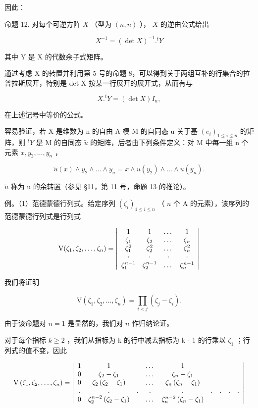 因此：

命题 12. 对每个可逆方阵 \(X\) （型为 \((n, n)\) ）， \(X\) 的逆由公式给出

\[
X ^ {- 1} = (\det X) ^ {- 1}. ^ {t} Y\tag{27}
\]

其中 Y 是 X 的代数余子式矩阵。

通过考虑 X 的转置并利用第 5 号的命题 8，可以得到关于两组互补的行集合的拉普拉斯展开，特别是 det X 按某一行展开的展开式，从而有与

\[
X. ^ {t} Y = (\det X) I _ {n},\tag{28}
\]

在上述记号中等价的公式。

容易验证，若 X 是维数为 n 的自由 A-模 M 的自同态 u 关于基 \((e_{i})_{1\leq i\leq n}\) 的矩阵，则 \(^{t}Y\) 是 M 的自同态 \(\tilde{u}\) 的矩阵，后者由下列条件定义：对 M 中每一组 n 个元素 \(x, y_{2}, \ldots, y_{n}\) ，

\[
\tilde {u} (x) \wedge y _ {2} \wedge \dots \wedge y _ {n} = x \wedge u (y _ {2}) \wedge \dots \wedge u (y _ {n}).
\]

\(\tilde{u}\) 称为 u 的余转置（参见 §11，第 11 号，命题 13 的推论）。

例。（1）范德蒙德行列式。给定序列 \((\zeta_{i})_{1\leqslant i\leqslant n}\) （ \(n\) 个 A 的元素），该序列的范德蒙德行列式是行列式

\[
\mathrm{V} (\zeta_ {1}, \zeta_ {2}, \dots , \zeta_ {n}) = \left| \begin{array}{c c c c} 1 & 1 & \dots & 1 \\ \zeta_ {1} & \zeta_ {2} & \dots & \zeta_ {n} \\ \zeta_ {1} ^ {2} & \zeta_ {2} ^ {2} & \dots & \zeta_ {n} ^ {2} \\ \cdot & \cdot & \cdot & \cdot \\ \zeta_ {1} ^ {n - 1} & \zeta_ {2} ^ {n - 1} & \dots & \zeta_ {n} ^ {n - 1} \end{array} \right|
\]

我们将证明

\[
\mathrm{V} \left(\zeta_ {1}, \zeta_ {2}, \dots , \zeta_ {n}\right) = \prod_ {i <   j} \left(\zeta_ {j} - \zeta_ {i}\right).\tag{29}
\]

由于该命题对 \(n = 1\) 是显然的，我们对 \(n\) 作归纳论证。

对于每个指标 \(k \geqslant 2\) ，我们从指标为 k 的行中减去指标为 k - 1 的行乘以 \(\zeta_{1}\) ；行列式的值不变，因此

\[
\mathrm{V} \left(\zeta_ {1}, \zeta_ {2}, \dots , \zeta_ {n}\right) = \left| \begin{array}{c c c c c c c c c} 1 & 1 & & \dots & 1 \\ 0 & \zeta_ {2} - \zeta_ {1} & & \dots & \zeta_ {n} - \zeta_ {1} \\ 0 & \zeta_ {2} \left(\zeta_ {2} - \zeta_ {1}\right) & & \dots & \zeta_ {n} \left(\zeta_ {n} - \zeta_ {1}\right) \\ . & . & . & . & . & . & . & . & . \\ 0 & \zeta_ {2} ^ {n - 2} \left(\zeta_ {2} - \zeta_ {1}\right) & & \dots & \zeta_ {n} ^ {n - 2} \left(\zeta_ {n} - \zeta_ {1}\right) \end{array} \right|
\]

